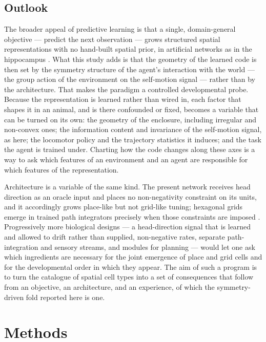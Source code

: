 \documentclass[9pt,lineno]{elife}
\begin{document}
\subsection*{Outlook}

The broader appeal of predictive learning is that a single, domain-general objective --- predict
the next observation --- grows structured spatial representations with no hand-built spatial
prior, in artificial networks as in the hippocampus \citep{levenstein2024, stachenfeld2017}. What
this study adds is that the geometry of the learned code is then set by the symmetry structure of
the agent's interaction with the world --- the group action of the environment on the self-motion
signal --- rather than by the architecture. That makes the paradigm a controlled developmental
probe. Because the representation is learned rather than wired in, each factor that shapes it in
an animal, and is there confounded or fixed, becomes a variable that can be turned on its own: the
geometry of the enclosure, including irregular and non-convex ones; the information content and
invariance of the self-motion signal, as here; the locomotor policy and the trajectory statistics
it induces; and the task the agent is trained under. Charting how the code changes along these
axes is a way to ask which features of an environment and an agent are responsible for which
features of the representation.

Architecture is a variable of the same kind. The present network receives head direction as an
oracle input and places no non-negativity constraint on its units, and it accordingly grows
place-like but not grid-like tuning; hexagonal grids emerge in trained path integrators precisely
when those constraints are imposed \citep{sorscher2023unified}. Progressively more biological
designs --- a head-direction signal that is learned and allowed to drift rather than supplied,
non-negative rates, separate path-integration and sensory streams, and modules for planning ---
would let one ask which ingredients are necessary for the joint emergence of place and grid cells
and for the developmental order in which they appear. The aim of such a program is to turn the
catalogue of spatial cell types into a set of consequences that follow from an objective, an
architecture, and an experience, of which the symmetry-driven fold reported here is one.

\section{Methods}
\end{document}
